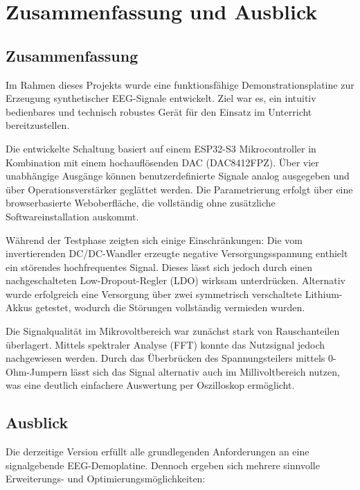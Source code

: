 \chapter{Zusammenfassung und Ausblick}
\label{schluss}

\section{Zusammenfassung}

Im Rahmen dieses Projekts wurde eine funktionsfähige Demonstrationsplatine zur Erzeugung synthetischer EEG-Signale entwickelt. Ziel war es, ein intuitiv bedienbares und technisch robustes Gerät für den Einsatz im Unterricht bereitzustellen. 

Die entwickelte Schaltung basiert auf einem ESP32-S3 Mikrocontroller in Kombination mit einem hochauflösenden DAC (DAC8412FPZ). Über vier unabhängige Ausgänge können benutzerdefinierte Signale analog ausgegeben und über Operationsverstärker geglättet werden. Die Parametrierung erfolgt über eine browserbasierte Weboberfläche, die vollständig ohne zusätzliche Softwareinstallation auskommt.

Während der Testphase zeigten sich einige Einschränkungen: Die vom invertierenden DC/DC-Wandler erzeugte negative Versorgungsspannung enthielt ein störendes hochfrequentes Signal. Dieses lässt sich jedoch durch einen nachgeschalteten Low-Dropout-Regler (LDO) wirksam unterdrücken. Alternativ wurde erfolgreich eine Versorgung über zwei symmetrisch verschaltete Lithium-Akkus getestet, wodurch die Störungen vollständig vermieden wurden.

Die Signalqualität im Mikrovoltbereich war zunächst stark von Rauschanteilen überlagert. Mittels spektraler Analyse (FFT) konnte das Nutzsignal jedoch nachgewiesen werden. Durch das Überbrücken des Spannungsteilers mittels 0-Ohm-Jumpern lässt sich das Signal alternativ auch im Millivoltbereich nutzen, was eine deutlich einfachere Auswertung per Oszilloskop ermöglicht.

\section{Ausblick}

Die derzeitige Version erfüllt alle grundlegenden Anforderungen an eine signalgebende EEG-Demoplatine. Dennoch ergeben sich mehrere sinnvolle Erweiterungs- und Optimierungsmöglichkeiten:

